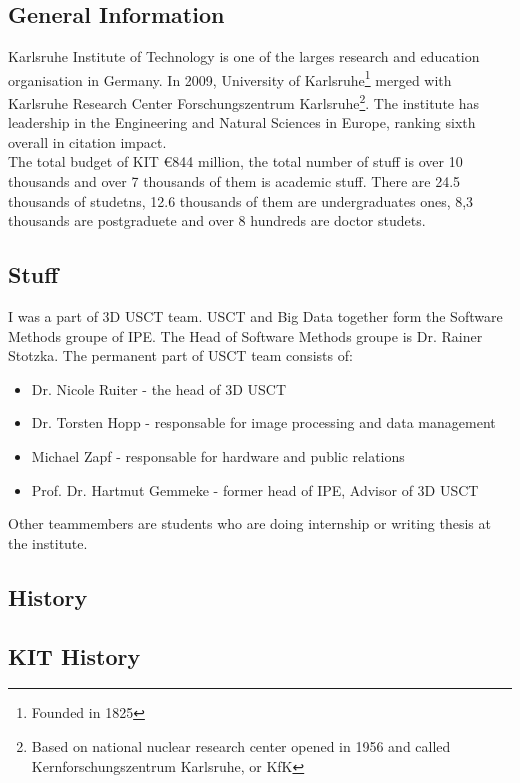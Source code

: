 \documentclass[english]{article}
\begin{document}
\subsection{General Information}

Karlsruhe Institute of Technology is one of the larges research and education organisation in Germany. In 2009, University of Karlsruhe\footnote{Founded in 1825} merged with Karlsruhe Research Center Forschungszentrum Karlsruhe\footnote{Based on national nuclear research center opened in 1956 and called Kernforschungszentrum Karlsruhe, or KfK}. The institute has leadership in the Engineering and Natural Sciences in Europe, ranking sixth overall in citation impact.\\

The total budget of KIT \euro 844 million, the total number of stuff is over 10 thousands and over 7 thousands of them is academic stuff. There are 24.5 thousands of studetns, 12.6 thousands of them are undergraduates ones, 8,3 thousands are postgraduete and over 8 hundreds are doctor studets.
\subsection{Stuff}

I was a part of 3D USCT team. USCT and Big Data together form the Software Methods groupe of IPE. The Head of Software Methods groupe is Dr. Rainer Stotzka. The permanent part of USCT team consists of:  
\begin{itemize}
\item Dr. Nicole Ruiter - the head of 3D USCT
\item Dr. Torsten Hopp - responsable for image processing and data management
\item Michael Zapf - responsable for hardware and public relations
\item Prof. Dr. Hartmut Gemmeke - former head of IPE, Advisor of 3D USCT
\end{itemize}

Other teammembers are students who are doing internship or writing thesis at the institute.

\subsection{History}

\subsection{KIT History}
\end{document}
